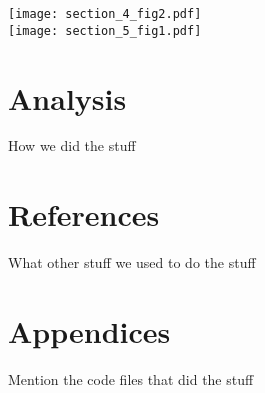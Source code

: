 \documentclass[letterpaper,titlepage,10pt]{article}
\begin{document}
\texttt{[image: section\_4\_fig2.pdf]}\\
\texttt{[image: section\_5\_fig1.pdf]}\\
\section{Analysis}
How we did the stuff
\section{References}
What other stuff we used to do the stuff
\section{Appendices}
Mention the code files that did the stuff
\end{document}
